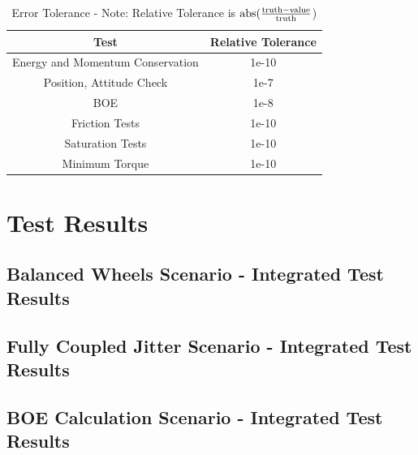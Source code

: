 \begin{table}[htbp]
	\caption{Error Tolerance - Note: Relative Tolerance is $\textnormal{abs}(\frac{\textnormal{truth} - \textnormal{value}}{\textnormal{truth}}$)}
	\label{tab:errortol}
	\centering \fontsize{10}{10}\selectfont
	\begin{tabular}{| c | c |} %
		\hline
		Test   & Relative Tolerance \\
		\hline
		Energy and Momentum Conservation & 1e-10 \\
		\hline
		Position, Attitude Check & 1e-7 \\
		\hline
		BOE & 1e-8 \\
		\hline
		Friction Tests & 1e-10 \\
		\hline
		Saturation Tests & 1e-10 \\
		\hline
		Minimum Torque & 1e-10 \\
		\hline	
	\end{tabular}
\end{table}

\clearpage

\section{Test Results}

\subsection{Balanced Wheels Scenario - Integrated Test Results}






\clearpage

\subsection{Fully Coupled Jitter Scenario - Integrated Test Results}






\clearpage

\subsection{BOE Calculation Scenario - Integrated Test Results}

